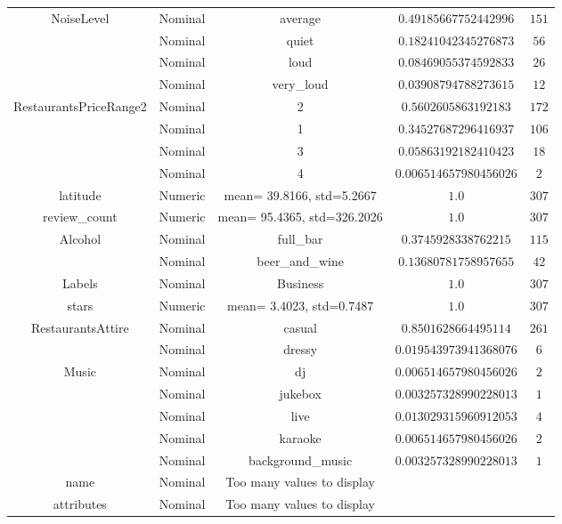 \begin{tabular}{|c|c|c|c|c|}
\multirow{4}{*}{NoiseLevel} & Nominal & average & $0.49185667752442996$ & $151$ \\ \cline{2-4} 
 & Nominal & quiet & $0.18241042345276873$ & $56$ \\ \cline{2-4} 
 & Nominal & loud & $0.08469055374592833$ & $26$ \\ \cline{2-4} 
 & Nominal & very_loud & $0.03908794788273615$ & $12$ \\ \hline 
\multirow{4}{*}{RestaurantsPriceRange2} & Nominal & 2 & $0.5602605863192183$ & $172$ \\ \cline{2-4} 
 & Nominal & 1 & $0.34527687296416937$ & $106$ \\ \cline{2-4} 
 & Nominal & 3 & $0.05863192182410423$ & $18$ \\ \cline{2-4} 
 & Nominal & 4 & $0.006514657980456026$ & $2$ \\ \hline 
\multirow{1}{*}{latitude} & Numeric &  mean= 39.8166, std=5.2667 & $1.0$ & $307$ \\ \hline 
\multirow{1}{*}{review_count} & Numeric &  mean= 95.4365, std=326.2026 & $1.0$ & $307$ \\ \hline 
\multirow{2}{*}{Alcohol} & Nominal & full_bar & $0.3745928338762215$ & $115$ \\ \cline{2-4} 
 & Nominal & beer_and_wine & $0.13680781758957655$ & $42$ \\ \hline 
\multirow{1}{*}{Labels} & Nominal & Business & $1.0$ & $307$ \\ \hline 
\multirow{1}{*}{stars} & Numeric &  mean= 3.4023, std=0.7487 & $1.0$ & $307$ \\ \hline 
\multirow{2}{*}{RestaurantsAttire} & Nominal & casual & $0.8501628664495114$ & $261$ \\ \cline{2-4} 
 & Nominal & dressy & $0.019543973941368076$ & $6$ \\ \hline 
\multirow{5}{*}{Music} & Nominal & dj & $0.006514657980456026$ & $2$ \\ \cline{2-4} 
 & Nominal & jukebox & $0.003257328990228013$ & $1$ \\ \cline{2-4} 
 & Nominal & live & $0.013029315960912053$ & $4$ \\ \cline{2-4} 
 & Nominal & karaoke & $0.006514657980456026$ & $2$ \\ \cline{2-4} 
 & Nominal & background_music & $0.003257328990228013$ & $1$ \\ \hline 
name & Nominal & Too many values to display & \\ \hline
attributes & Nominal & Too many values to display & \\ \hline

\end{tabular}
